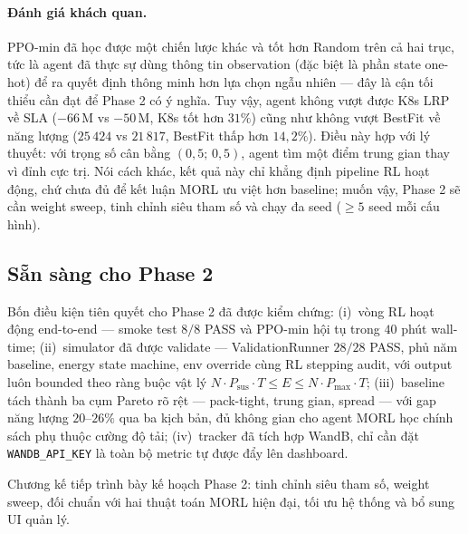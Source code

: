 \paragraph{Đánh giá khách quan.}
PPO-min đã học được một chiến lược khác và tốt hơn Random trên cả
hai trục, tức là agent đã thực sự dùng thông tin observation (đặc
biệt là phần state one-hot) để ra quyết định thông minh hơn lựa chọn
ngẫu nhiên --- đây là cận tối thiểu cần đạt để Phase 2 có ý nghĩa.
Tuy vậy, agent không vượt được K8s LRP về SLA ($-66$\,M vs $-50$\,M,
K8s tốt hơn $31\%$) cũng như không vượt BestFit về năng lượng
($25\,424$ vs $21\,817$, BestFit thấp hơn $14{,}2\%$). Điều này hợp
với lý thuyết: với trọng số cân bằng $(0{,}5;\, 0{,}5)$, agent tìm
một điểm trung gian thay vì đỉnh cực trị. Nói cách khác, kết quả này
chỉ khẳng định pipeline RL hoạt động, chứ chưa đủ để kết luận MORL
ưu việt hơn baseline; muốn vậy, Phase 2 sẽ cần weight sweep, tinh
chỉnh siêu tham số và chạy đa seed ($\ge 5$ seed mỗi cấu hình).

\subsection{Sẵn sàng cho Phase 2}

Bốn điều kiện tiên quyết cho Phase 2 đã được kiểm chứng:
(i)~vòng RL hoạt động end-to-end --- smoke test $8/8$ PASS và
PPO-min hội tụ trong $40$ phút wall-time;
(ii)~simulator đã được validate --- ValidationRunner $28/28$ PASS,
phủ năm baseline, energy state machine, env override cùng RL
stepping audit, với output luôn bounded theo ràng buộc vật lý
$N \cdot P_{\mathrm{sus}} \cdot T \le E \le N \cdot P_{\max} \cdot T$;
(iii)~baseline tách thành ba cụm Pareto rõ rệt --- pack-tight,
trung gian, spread --- với gap năng lượng $20$--$26\%$ qua ba kịch
bản, đủ không gian cho agent MORL học chính sách phụ thuộc cường độ
tải; (iv)~tracker đã tích hợp WandB, chỉ cần đặt
\texttt{WANDB\_API\_KEY} là toàn bộ metric tự được đẩy lên dashboard.

Chương kế tiếp trình bày kế hoạch Phase 2: tinh chỉnh siêu tham số,
weight sweep, đối chuẩn với hai thuật toán MORL hiện đại, tối ưu
hệ thống và bổ sung UI quản lý.
